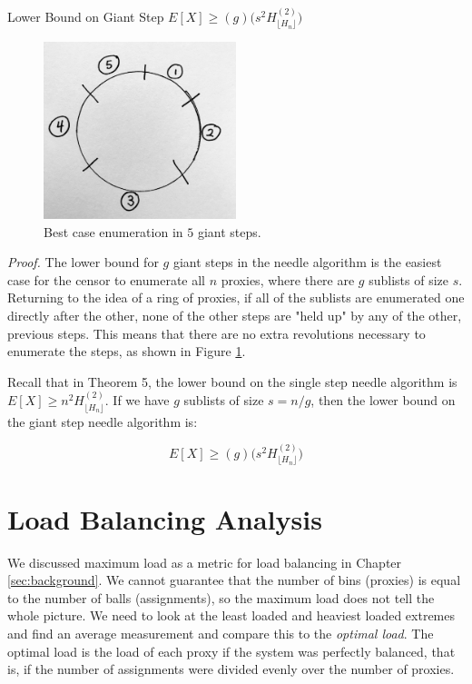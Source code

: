 \label{LBGS}
\begin{theorem}{Lower Bound on Giant Step $E[X] \geq (g)\bigg(s^2H^{(2)}_{\lfloor{H_n}\rfloor}\bigg)$} 
\end{theorem}

\begin{figure}[h!]
\centering
     \includegraphics[width=0.5\textwidth]{fig/giant_step_lower_bound.png}
    \caption{Best case enumeration in $5$ giant steps.}

    \label{fig:lbgs}
\end{figure}

\emph{Proof.} The lower bound for $g$ giant steps in the needle algorithm is the easiest case for the censor to enumerate all $n$ proxies, where there are $g$ sublists of size $s$. Returning to the idea of a ring of proxies, if all of the sublists are enumerated one directly after the other, none of the other steps are "held up" by any of the other, previous steps. This means that there are no extra revolutions necessary to enumerate the steps, as shown in Figure \ref{fig:lbgs}. 

Recall that in Theorem 5, the lower bound on the single step needle algorithm is $E[X] \geq n^2H^{(2)}_{\lfloor{H_n}\rfloor}$. If we have $g$ sublists of size $s=n/g$, then the lower bound on the giant step needle algorithm is:

$$E[X] \geq (g)\bigg(s^2H^{(2)}_{\lfloor{H_n}\rfloor}\bigg)$$

\label{sec:lb}
\section{Load Balancing Analysis}

We discussed maximum load as a metric for load balancing in Chapter \ref{sec:background}. We cannot guarantee that the number of bins (proxies) is equal to the number of balls (assignments), so the maximum load does not tell the whole picture. We need to look at the least loaded and heaviest loaded extremes and find an average measurement and compare this to the \textit{optimal load}. The optimal load is the load of each proxy if the system was perfectly balanced, that is, if the number of assignments were divided evenly over the number of proxies.

